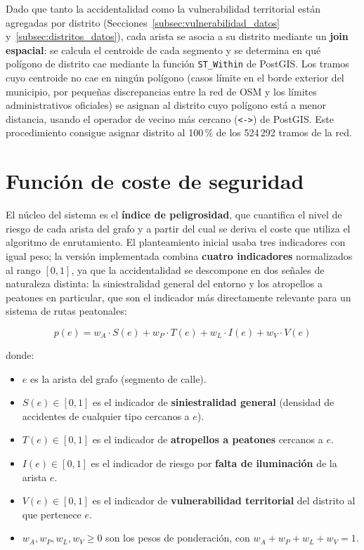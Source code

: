 Dado que tanto la accidentalidad como la vulnerabilidad territorial están agregadas por distrito (Secciones~\ref{subsec:vulnerabilidad_datos} y~\ref{subsec:distritos_datos}), cada arista se asocia a su distrito mediante un \textbf{join espacial}: se calcula el centroide de cada segmento y se determina en qué polígono de distrito cae mediante la función \texttt{ST\_Within} de PostGIS. Los tramos cuyo centroide no cae en ningún polígono (casos límite en el borde exterior del municipio, por pequeñas discrepancias entre la red de OSM y los límites administrativos oficiales) se asignan al distrito cuyo polígono está a menor distancia, usando el operador de vecino más cercano (\texttt{<->}) de PostGIS. Este procedimiento consigue asignar distrito al 100\,\% de los 524\,292 tramos de la red.

\section{Función de coste de seguridad}
\label{sec:funcion_coste}

El núcleo del sistema es el \textbf{índice de peligrosidad}, que cuantifica el nivel de riesgo de cada arista del grafo y a partir del cual se deriva el coste que utiliza el algoritmo de enrutamiento. El planteamiento inicial usaba tres indicadores con igual peso; la versión implementada combina \textbf{cuatro indicadores} normalizados al rango $[0, 1]$, ya que la accidentalidad se descompone en dos señales de naturaleza distinta: la siniestralidad general del entorno y los atropellos a peatones en particular, que son el indicador más directamente relevante para un sistema de rutas peatonales:

\begin{equation}
    p(e) = w_A \cdot S(e) + w_P \cdot T(e) + w_L \cdot I(e) + w_V \cdot V(e)
    \label{eq:coste}
\end{equation}

donde:
\begin{itemize}
    \item $e$ es la arista del grafo (segmento de calle).
    \item $S(e) \in [0, 1]$ es el indicador de \textbf{siniestralidad general} (densidad de accidentes de cualquier tipo cercanos a $e$).
    \item $T(e) \in [0, 1]$ es el indicador de \textbf{atropellos a peatones} cercanos a $e$.
    \item $I(e) \in [0, 1]$ es el indicador de riesgo por \textbf{falta de iluminación} de la arista $e$.
    \item $V(e) \in [0, 1]$ es el indicador de \textbf{vulnerabilidad territorial} del distrito al que pertenece $e$.
    \item $w_A, w_P, w_L, w_V \geq 0$ son los pesos de ponderación, con $w_A + w_P + w_L + w_V = 1$.
\end{itemize}


